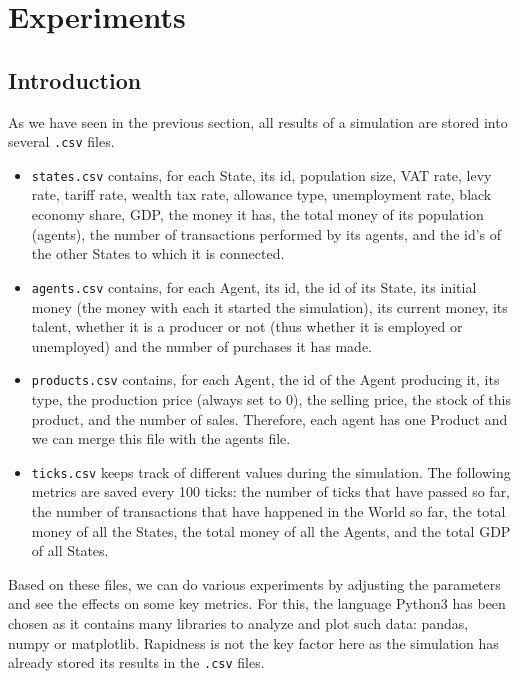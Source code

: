 \chapter{Experiments}


\section{Introduction}

As we have seen in the previous section, all results of a simulation are stored into several \texttt{.csv} files.

\begin{itemize}
    \item \texttt{states.csv} contains, for each State, its id, population size, VAT rate, levy rate, tariff rate, wealth tax rate, allowance type, unemployment rate, black economy share, GDP, the money it has, the total money of its population (agents), the number of transactions performed by its agents, and the id's of the other States to which it is connected.

    \item \texttt{agents.csv} contains, for each Agent, its id, the id of its State, its initial money (the money with each it started the simulation), its current money, its talent, whether it is a producer or not (thus whether it is employed or unemployed) and the number of purchases it has made.
    
    \item \texttt{products.csv} contains, for each Agent, the id of the Agent producing it, its type, the production price (always set to 0), the selling price, the stock of this product, and the number of sales. Therefore, each agent has one Product and we can merge this file with the agents file.
    
    \item \texttt{ticks.csv} keeps track of different values during the simulation. The following metrics are saved every 100 ticks: the number of ticks that have passed so far, the number of transactions that have happened in the World so far, the total money of all the States, the total money of all the Agents, and the total GDP of all States.
\end{itemize}

Based on these files, we can do various experiments by adjusting the parameters and see the effects on some key metrics. For this, the language Python3 has been chosen as it contains many libraries to analyze and plot such data: pandas, numpy or matplotlib. Rapidness is not the key factor here as the simulation has already stored its results in the \texttt{.csv} files.

